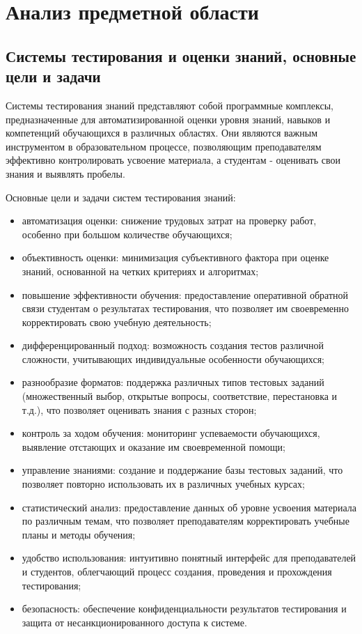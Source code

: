 \section{Анализ предметной области}
\subsection{Системы тестирования и оценки знаний, основные цели и задачи}

Системы тестирования знаний представляют собой программные комплексы, предназначенные для автоматизированной оценки уровня знаний, навыков и компетенций обучающихся в различных областях. Они являются важным инструментом в образовательном процессе, позволяющим преподавателям эффективно контролировать усвоение материала, а студентам - оценивать свои знания и выявлять пробелы.

Основные цели и задачи систем тестирования знаний:
\begin{itemize}
	\item автоматизация оценки: снижение трудовых затрат на проверку работ, особенно при большом количестве обучающихся;
	\item объективность оценки: минимизация субъективного фактора при оценке знаний, основанной на четких критериях и алгоритмах;
	\item повышение эффективности обучения: предоставление оперативной обратной связи студентам о результатах тестирования, что позволяет им своевременно корректировать свою учебную деятельность;
	\item дифференцированный подход: возможность создания тестов различной сложности, учитывающих индивидуальные особенности обучающихся;
	\item разнообразие форматов: поддержка различных типов тестовых заданий (множественный выбор, открытые вопросы, соответствие, перестановка и т.д.), что позволяет оценивать знания с разных сторон;
	\item контроль за ходом обучения: мониторинг успеваемости обучающихся, выявление отстающих и оказание им своевременной помощи;
	\item управление знаниями: создание и поддержание базы тестовых заданий, что позволяет повторно использовать их в различных учебных курсах;
	\item статистический анализ: предоставление данных об уровне усвоения материала по различным темам, что позволяет преподавателям корректировать учебные планы и методы обучения;
	\item удобство использования: интуитивно понятный интерфейс для преподавателей и студентов, облегчающий процесс создания, проведения и прохождения тестирования;
	\item безопасность: обеспечение конфиденциальности результатов тестирования и защита от несанкционированного доступа к системе.
\end{itemize}

